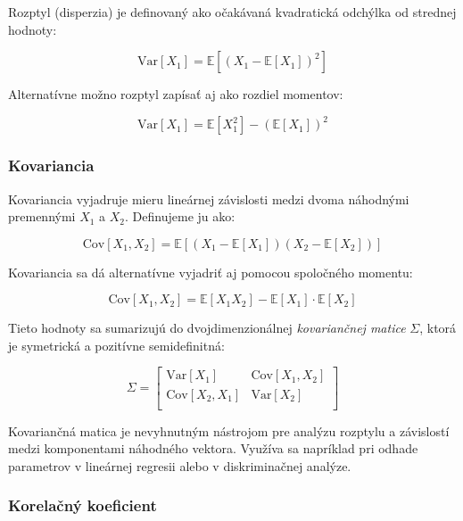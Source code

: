 Rozptyl (disperzia) je definovaný ako očakávaná kvadratická odchýlka od strednej hodnoty:

\begin{equation}
\mathrm{Var}[X_1] = \mathbb{E}[(X_1 - \mathbb{E}[X_1])^2]
\end{equation}

Alternatívne možno rozptyl zapísať aj ako rozdiel momentov:

\begin{equation}
\mathrm{Var}[X_1] = \mathbb{E}[X_1^2] - (\mathbb{E}[X_1])^2
\end{equation}

\subsubsection{Kovariancia}\label{subsubsec:joint_covariance}

Kovariancia vyjadruje mieru lineárnej závislosti medzi dvoma náhodnými premennými \(X_1\) a \(X_2\). Definujeme ju ako:

\begin{equation}
\mathrm{Cov}[X_1, X_2] = \mathbb{E}[(X_1 - \mathbb{E}[X_1])(X_2 - \mathbb{E}[X_2])]
\end{equation}

Kovariancia sa dá alternatívne vyjadriť aj pomocou spoločného momentu:

\begin{equation}
\mathrm{Cov}[X_1, X_2] = \mathbb{E}[X_1 X_2] - \mathbb{E}[X_1] \cdot \mathbb{E}[X_2]
\end{equation}

Tieto hodnoty sa sumarizujú do dvojdimenzionálnej \textit{kovariančnej matice} \(\Sigma\), ktorá je symetrická a pozitívne semidefinitná:

\begin{equation}
\Sigma = 
\begin{bmatrix}
\mathrm{Var}[X_1] & \mathrm{Cov}[X_1, X_2] \\
\mathrm{Cov}[X_2, X_1] & \mathrm{Var}[X_2] \\
\end{bmatrix}
\end{equation}

Kovariančná matica je nevyhnutným nástrojom pre analýzu rozptylu a závislostí medzi komponentami náhodného vektora. Využíva sa napríklad pri odhade parametrov v lineárnej regresii alebo v diskriminačnej analýze.

\subsubsection{Korelačný koeficient}\label{subsubsec:correlation}

